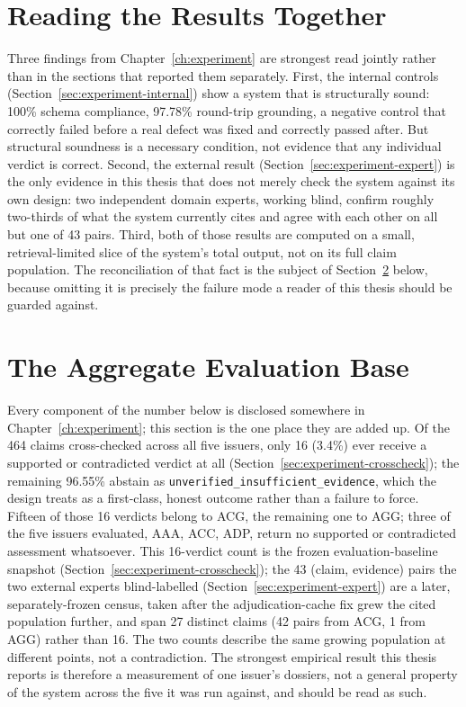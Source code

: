 \documentclass[fontsize=12pt,oneside,headings=small]{scrreprt}
\begin{document}
\section{Reading the Results Together}
\label{sec:discussion-synthesis}

Three findings from Chapter~\ref{ch:experiment} are strongest read jointly rather than in the sections that reported them separately. First, the internal controls (Section~\ref{sec:experiment-internal}) show a system that is structurally sound: 100\% schema compliance, 97.78\% round-trip grounding, a negative control that correctly failed before a real defect was fixed and correctly passed after. But structural soundness is a necessary condition, not evidence that any individual verdict is correct. Second, the external result (Section~\ref{sec:experiment-expert}) is the only evidence in this thesis that does not merely check the system against its own design: two independent domain experts, working blind, confirm roughly two-thirds of what the system currently cites and agree with each other on all but one of 43 pairs. Third, both of those results are computed on a small, retrieval-limited slice of the system's total output, not on its full claim population. The reconciliation of that fact is the subject of Section~\ref{sec:discussion-aggregate-base} below, because omitting it is precisely the failure mode a reader of this thesis should be guarded against.

\section{The Aggregate Evaluation Base}
\label{sec:discussion-aggregate-base}

Every component of the number below is disclosed somewhere in Chapter~\ref{ch:experiment}; this section is the one place they are added up. Of the 464 claims cross-checked across all five issuers, only 16 (3.4\%) ever receive a \textsf{supported} or \textsf{contradicted} verdict at all (Section~\ref{sec:experiment-crosscheck}); the remaining 96.55\% abstain as \texttt{unverified\_insufficient\_evidence}, which the design treats as a first-class, honest outcome rather than a failure to force. Fifteen of those 16 verdicts belong to ACG, the remaining one to AGG; three of the five issuers evaluated, AAA, ACC, ADP, return no supported or contradicted assessment whatsoever. This 16-verdict count is the frozen evaluation-baseline snapshot (Section~\ref{sec:experiment-crosscheck}); the 43 (claim, evidence) pairs the two external experts blind-labelled (Section~\ref{sec:experiment-expert}) are a later, separately-frozen census, taken after the adjudication-cache fix grew the cited population further, and span 27 distinct claims (42 pairs from ACG, 1 from AGG) rather than 16. The two counts describe the same growing population at different points, not a contradiction. The strongest empirical result this thesis reports is therefore a measurement of one issuer's dossiers, not a general property of the system across the five it was run against, and should be read as such.
\end{document}
